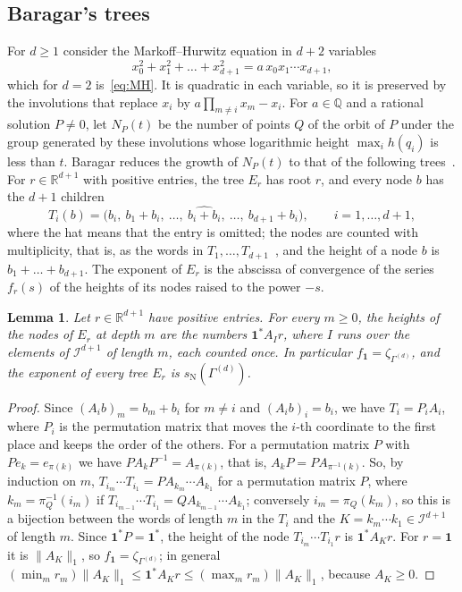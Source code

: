 \documentclass[11pt]{amsart}
\newtheorem{lemma}[proposition]{Lemma}
\theoremstyle{definition}
\theoremstyle{remark}
\newcommand{\one}{\mathbf 1}
\newcommand{\R}{\mathbb R}
\newcommand{\cI}{\mathcal I}
\newcommand{\sN}{s_{\mathrm N}}
\newcommand{\norm}[1]{\lVert #1\rVert}
\begin{document}
\subsection*{Baragar's trees}
For $d\ge1$ consider the Markoff--Hurwitz equation in $d+2$ variables
\begin{equation}\label{eq:MHd}
  x_0^2+x_1^2+\dots+x_{d+1}^2=a\,x_0x_1\cdots x_{d+1},
\end{equation}
which for $d=2$ is~\eqref{eq:MH}. It is quadratic in each variable, so it is preserved by the involutions that replace $x_i$ by $a\prod_{m\ne i}x_m-x_i$. For $a\in\mathbb Q$ and a rational solution $P\neq0$, let $N_P(t)$ be the number of points $Q$ of the orbit of $P$ under the group generated by these involutions whose logarithmic height $\max_ih(q_i)$ is less than $t$. Baragar reduces the growth of $N_P(t)$ to that of the following trees~\cite{Bar98}. For $r\in\R^{d+1}$ with positive entries, the tree $E_r$ has root $r$, and every node $b$ has the $d+1$ children
\[
  T_i(b)=\bigl(b_i,\ b_1+b_i,\ \dots,\ \widehat{b_i+b_i},\ \dots,\ b_{d+1}+b_i\bigr),\qquad i=1,\dots,d+1,
\]
where the hat means that the entry is omitted; the nodes are counted with multiplicity, that is, as the words in $T_1,\dots,T_{d+1}$~\cite[\S4]{Bar98}, and the height of a node $b$ is $b_1+\dots+b_{d+1}$. The exponent of $E_r$ is the abscissa of convergence of the series $f_r(s)$ of the heights of its nodes raised to the power $-s$.

\begin{lemma}\label{lem:baragartree}
Let $r\in\R^{d+1}$ have positive entries. For every $m\ge0$, the heights of the nodes of $E_r$ at depth $m$ are the numbers $\one^*A_Ir$, where $I$ runs over the elements of $\cI^{d+1}$ of length $m$, each counted once. In particular $f_\one=\zeta_{\Gamma^{(d)}}$, and the exponent of every tree $E_r$ is $\sN(\Gamma^{(d)})$.
\end{lemma}

\begin{proof}
Since $(A_ib)_m=b_m+b_i$ for $m\ne i$ and $(A_ib)_i=b_i$, we have $T_i=P_iA_i$, where $P_i$ is the permutation matrix that moves the $i$-th coordinate to the first place and keeps the order of the others. For a permutation matrix $P$ with $Pe_k=e_{\pi(k)}$ we have $PA_kP^{-1}=A_{\pi(k)}$, that is, $A_kP=PA_{\pi^{-1}(k)}$. So, by induction on $m$, $T_{i_m}\cdots T_{i_1}=PA_{k_m}\cdots A_{k_1}$ for a permutation matrix $P$, where $k_m=\pi_Q^{-1}(i_m)$ if $T_{i_{m-1}}\cdots T_{i_1}=QA_{k_{m-1}}\cdots A_{k_1}$; conversely $i_m=\pi_Q(k_m)$, so this is a bijection between the words of length $m$ in the $T_i$ and the $K=k_m\cdots k_1\in\cI^{d+1}$ of length $m$. Since $\one^*P=\one^*$, the height of the node $T_{i_m}\cdots T_{i_1}r$ is $\one^*A_Kr$. For $r=\one$ it is $\norm{A_K}_1$, so $f_\one=\zeta_{\Gamma^{(d)}}$; in general $(\min_mr_m)\norm{A_K}_1\le\one^*A_Kr\le(\max_mr_m)\norm{A_K}_1$, because $A_K\ge0$.
\end{proof}
\end{document}
